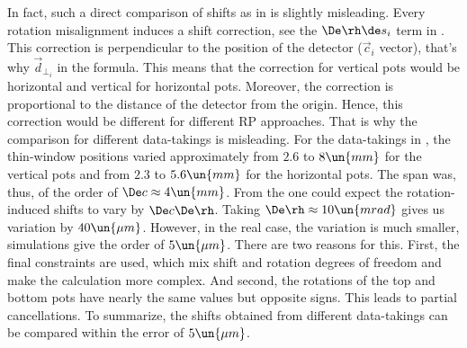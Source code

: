 In fact, such a direct comparison of shifts as in  is slightly misleading. Every rotation misalignment induces a shift correction, see the $\De\rh \de s_i$ term in . This correction is perpendicular to the position of the detector ($\vec c_i$ vector), that's why $\vec d_{\perp_i}$ in the formula. This means that the correction for vertical pots would be horizontal and vertical for horizontal pots. Moreover, the correction is proportional to the distance of the detector from the origin. Hence, this correction would be different for different RP approaches. That is why the comparison for different data-takings is misleading. For the data-takings in , the thin-window positions varied approximately from $2.6$ to $8\un{mm}$ for the vertical pots and from $2.3$ to $5.6\un{mm}$ for the horizontal pots. The span was, thus, of the order of $\De c \approx 4\un{mm}$. From the  one could expect the rotation-induced shifts to vary by $\De c \De \rh$. Taking $\De\rh \approx 10 \un{mrad}$ gives us variation by $40\un{\mu m}$. However, in the real case, the variation is much smaller, simulations give the order of $5\un{\mu m}$. There are two reasons for this. First, the final constraints are used, which mix shift and rotation degrees of freedom and make the calculation more complex. And second, the rotations of the top and bottom pots have nearly the same values but opposite signs. This leads to partial cancellations. To summarize, the shifts obtained from different data-takings can be compared within the error of $5\un{\mu m}$.


